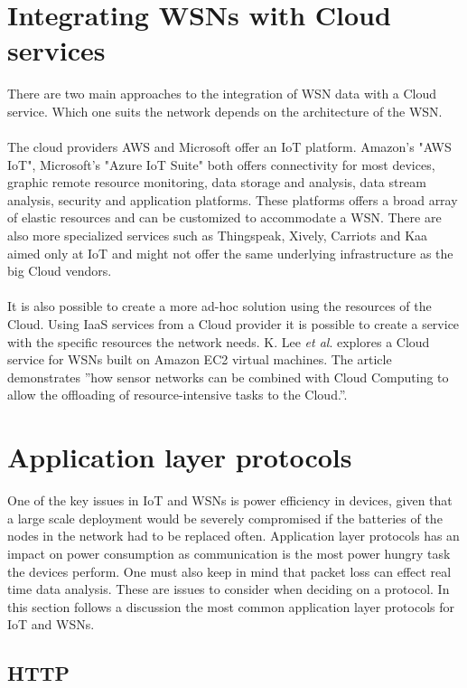 \documentclass[]{uiophd}
\begin{document}
\section{Integrating WSNs with Cloud services}
There are two main approaches to the integration of WSN data with a Cloud service. Which one suits the network depends on the architecture of the WSN.
\\\\
The cloud providers AWS and Microsoft offer an IoT platform. Amazon's "AWS IoT", Microsoft's "Azure IoT Suite" both offers connectivity for most devices, graphic remote resource monitoring, data storage and analysis, data stream analysis, security and application platforms. These platforms offers a broad array of elastic resources and can be customized to accommodate a WSN. There are also more specialized services such as Thingspeak, Xively, Carriots and Kaa aimed only at IoT and might not offer the same underlying infrastructure as the big Cloud vendors.
\\\\
It is also possible to create a more ad-hoc solution using the resources of the Cloud. Using IaaS services from a Cloud provider it is possible to create a service with the specific resources the network needs. K. Lee \textit{et al}. \cite{5678063} explores a Cloud service for WSNs built on Amazon EC2 virtual machines. The article demonstrates ''how sensor networks can be combined with Cloud Computing to allow the offloading of resource-intensive tasks to the Cloud.''\cite[p.~7]{5678063}.

\section{Application layer protocols}
One of the key issues in IoT and WSNs is power efficiency in devices, given that a large scale deployment would be severely compromised if the batteries of the nodes in the network had to be replaced often. Application layer protocols has an impact on power consumption as communication is the most power hungry task the devices perform. One must also keep in mind that packet loss can effect real time data analysis. These are issues to consider when deciding on a protocol. In this section follows a discussion the most common application layer protocols for IoT and WSNs.

\subsection{HTTP}
 
\end{document}
